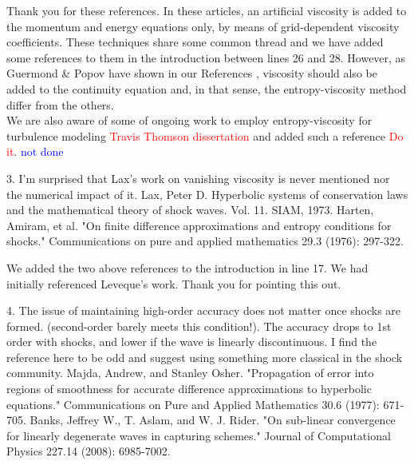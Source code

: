 \documentclass{article}
\newcommand{\tcr}[1]{\textcolor{red}{#1}}
\newcommand{\tcb}[1]{\textcolor{blue}{#1}}
\begin{document}
Thank you for these references. In these articles, an artificial viscosity is added to the momentum
and energy equations only, by means of grid-dependent viscosity coefficients. These techniques share some common thread and we have added some references to them in the introduction between lines 26 and 28.
However, as Guermond \& Popov have shown in our References \cite{jlg1, jlg2}, viscosity should also be added to the continuity equation and, in that sense, the entropy-viscosity method differ from the others.\\
We are also aware of some of ongoing work to employ entropy-viscosity for turbulence modeling \tcr{Travis Thomson dissertation} and added such a reference \tcr{Do it}. \tcb{not done}
\bigskip


{
\color{blue}
3. I'm surprised that Lax's work on vanishing viscosity is never mentioned
nor the numerical impact of it.
Lax, Peter D. Hyperbolic systems of conservation laws and the
mathematical theory of shock waves. Vol. 11. SIAM, 1973.
Harten, Amiram, et al. "On finite difference approximations and entropy
conditions for shocks." Communications on pure and applied mathematics
29.3 (1976): 297-322. 
}

We added the two above references to the introduction in line 17. We had initially referenced Leveque's work. Thank you for pointing this out.
\bigskip


{
\color{blue}
4. The issue of maintaining high-order accuracy does not matter once
shocks are formed. (second-order barely meets this condition!). The
accuracy drops to 1st order with shocks, and lower if the wave is linearly
discontinuous. I find the reference here to be odd and suggest using
something more classical in the shock community.
Majda, Andrew, and Stanley Osher. "Propagation of error into regions of
smoothness for accurate difference approximations to hyperbolic
equations." Communications on Pure and Applied Mathematics 30.6
(1977): 671-705.
Banks, Jeffrey W., T. Aslam, and W. J. Rider. "On sub-linear convergence
for linearly degenerate waves in capturing schemes." Journal of
Computational Physics 227.14 (2008): 6985-7002.
}
\end{document}
